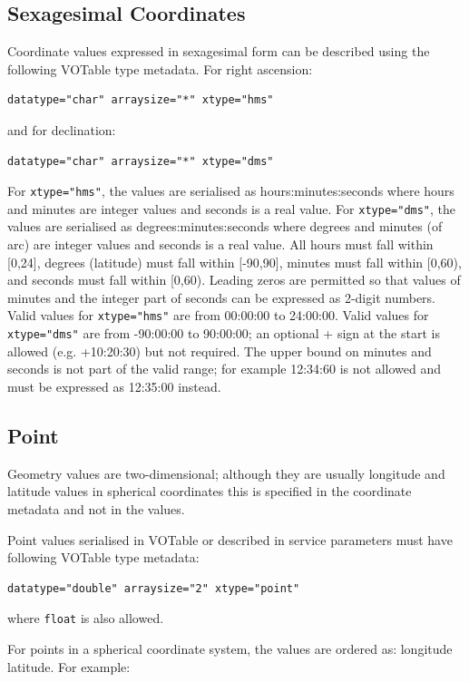 \documentclass[11pt,letter]{ivoa}
\begin{document}
\subsection{Sexagesimal Coordinates}
Coordinate values expressed in sexagesimal form can be described using the
following VOTable type metadata. For right ascension:

\begin{verbatim}
datatype="char" arraysize="*" xtype="hms"
\end{verbatim}
\noindent and for declination:
\begin{verbatim}
datatype="char" arraysize="*" xtype="dms"
\end{verbatim}

For \verb|xtype="hms"|, the values are serialised as hours:minutes:seconds where hours
and minutes are integer values and seconds is a real value. For \verb|xtype="dms"|, the values
are serialised as degrees:minutes:seconds where degrees and minutes (of arc) are integer
values and seconds is a real value. All hours must fall within [0,24], degrees
(latitude) must fall within [-90,90], minutes must fall within [0,60), and seconds
must fall within [0,60). Leading zeros are permitted so that values of minutes and the integer
part of seconds can be expressed as 2-digit numbers. Valid values for \verb|xtype="hms"| are
from 00:00:00 to 24:00:00.
Valid values for \verb|xtype="dms"| are from -90:00:00 to 90:00:00; an optional + sign at
the start is allowed (e.g. +10:20:30) but not required. The upper bound on minutes
and seconds is not part of the valid range; for example 12:34:60 is not allowed and must
be expressed as 12:35:00 instead.

\subsection{Point}
Geometry values are two-dimensional; although they are usually longitude and
latitude values in spherical coordinates this is specified in the coordinate
metadata and not in the values.

Point values serialised in VOTable or described in service parameters must have following
VOTable type metadata:

\begin{verbatim}
datatype="double" arraysize="2" xtype="point"
\end{verbatim}
\noindent where \verb|float| is also allowed.

For points in a spherical coordinate system, the values are ordered as: longitude latitude. For example:
\end{document}
